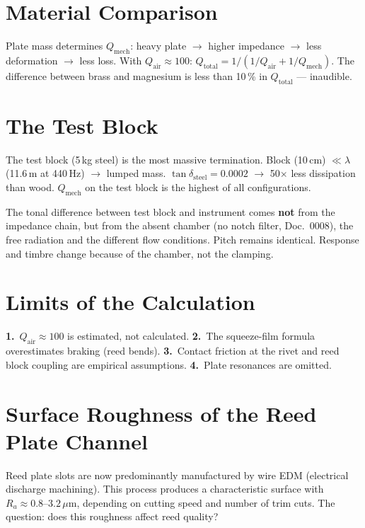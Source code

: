 \documentclass[11pt,a4paper]{article}
\begin{document}
\section{Material Comparison}

Plate mass determines $Q_\text{mech}$: heavy plate $\to$ higher impedance $\to$ less deformation $\to$ less loss. With $Q_\text{air} \approx 100$: $Q_\text{total} = 1/(1/Q_\text{air} + 1/Q_\text{mech})$. The difference between brass and magnesium is less than 10\,\% in $Q_\text{total}$ --- inaudible.

\section{The Test Block}

The test block (5\,kg steel) is the most massive termination. Block (10\,cm) $\ll \lambda$ (11.6\,m at 440\,Hz) $\to$ lumped mass. $\tan\delta_\text{steel} = 0{.}0002$ $\to$ 50$\times$ less dissipation than wood. $Q_\text{mech}$ on the test block is the highest of all configurations.

The tonal difference between test block and instrument comes \textbf{not} from the impedance chain, but from the absent chamber (no notch filter, Doc.~0008), the free radiation and the different flow conditions. Pitch remains identical. Response and timbre change because of the chamber, not the clamping.

\section{Limits of the Calculation}

\textbf{1.}~$Q_\text{air} \approx 100$ is estimated, not calculated. \textbf{2.}~The squeeze-film formula overestimates braking (reed bends). \textbf{3.}~Contact friction at the rivet and reed block coupling are empirical assumptions. \textbf{4.}~Plate resonances are omitted.

\section{Surface Roughness of the Reed Plate Channel}

Reed plate slots are now predominantly manufactured by wire EDM (electrical discharge machining). This process produces a characteristic surface with $R_a \approx 0{.}8$--$3{.}2\,\mu$m, depending on cutting speed and number of trim cuts. The question: does this roughness affect reed quality?
\end{document}
